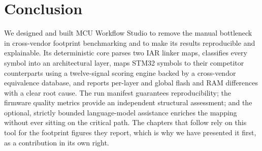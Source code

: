 \section*{Conclusion}

We designed and built MCU Workflow Studio to remove the manual bottleneck in cross-vendor
footprint benchmarking and to make its results reproducible and explainable. Its deterministic
core parses two IAR linker maps, classifies every symbol into an architectural layer, maps
STM32 symbols to their competitor counterparts using a twelve-signal scoring engine backed by a
cross-vendor equivalence database, and reports per-layer and global flash and RAM differences
with a clear root cause. The run manifest guarantees reproducibility; the firmware quality
metrics provide an independent structural assessment; and the optional, strictly bounded
language-model assistance enriches the mapping without ever sitting on the critical path. The
chapters that follow rely on this tool for the footprint figures they report, which is why we
have presented it first, as a contribution in its own right.
